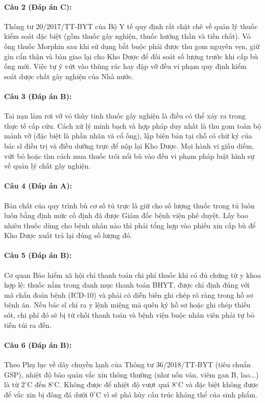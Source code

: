 \documentclass[12pt,a4paper]{article}
\begin{document}
\paragraph{\textbf{Câu 2 (Đáp án C):}} Thông tư 20/2017/TT-BYT của Bộ Y tế quy định rất chặt chẽ về quản lý thuốc kiểm soát đặc biệt (gồm thuốc gây nghiện, thuốc hướng thần và tiền chất). Vỏ ống thuốc Morphin sau khi sử dụng bắt buộc phải được thu gom nguyên vẹn, giữ gìn cẩn thận và bàn giao lại cho Kho Dược để đối soát số lượng trước khi cấp bù ống mới. Việc tự ý vứt vào thùng rác hay đập vỡ đều vi phạm quy định kiểm soát dược chất gây nghiện của Nhà nước.

\paragraph{\textbf{Câu 3 (Đáp án B):}} Tai nạn làm rơi vỡ vỏ thủy tinh thuốc gây nghiện là điều có thể xảy ra trong thực tế cấp cứu. Cách xử lý minh bạch và hợp pháp duy nhất là thu gom toàn bộ mảnh vỡ (đặc biệt là phần nhãn và cổ ống), lập biên bản tại chỗ có chữ ký của bác sĩ điều trị và điều dưỡng trực để nộp lại Kho Dược. Mọi hành vi giấu diếm, vứt bỏ hoặc tìm cách mua thuốc trôi nổi bù vào đều vi phạm pháp luật hình sự về quản lý chất gây nghiện.

\paragraph{\textbf{Câu 4 (Đáp án A):}} Bản chất của quy trình bù cơ số tủ trực là giữ cho số lượng thuốc trong tủ luôn luôn bằng định mức cố định đã được Giám đốc bệnh viện phê duyệt. Lấy bao nhiêu thuốc dùng cho bệnh nhân nào thì phải tổng hợp vào phiếu xin cấp bù để Kho Dược xuất trả lại đúng số lượng đó.

\paragraph{\textbf{Câu 5 (Đáp án B):}} Cơ quan Bảo hiểm xã hội chỉ thanh toán chi phí thuốc khi có đủ chứng từ y khoa hợp lệ: thuốc nằm trong danh mục thanh toán BHYT, được chỉ định đúng với mã chẩn đoán bệnh (ICD-10) và phải có diễn biến ghi chép rõ ràng trong hồ sơ bệnh án. Nếu bác sĩ chỉ ra y lệnh miệng mà quên ký hồ sơ hoặc ghi chép thiếu sót, chi phí đó sẽ bị từ chối thanh toán và bệnh viện buộc nhân viên phải tự bỏ tiền túi ra đền.

\paragraph{\textbf{Câu 6 (Đáp án B):}} Theo Phụ lục về dây chuyền lạnh của Thông tư 36/2018/TT-BYT (tiêu chuẩn GSP), nhiệt độ bảo quản vắc xin thông thường (như uốn ván, viêm gan B, lao...) là từ $2^\circ\text{C}$ đến $8^\circ\text{C}$. Không được để nhiệt độ vượt quá $8^\circ\text{C}$ và đặc biệt không được để vắc xin bị đông đá dưới $0^\circ\text{C}$ vì sẽ phá hủy cấu trúc kháng thể của sinh phẩm.
\end{document}
